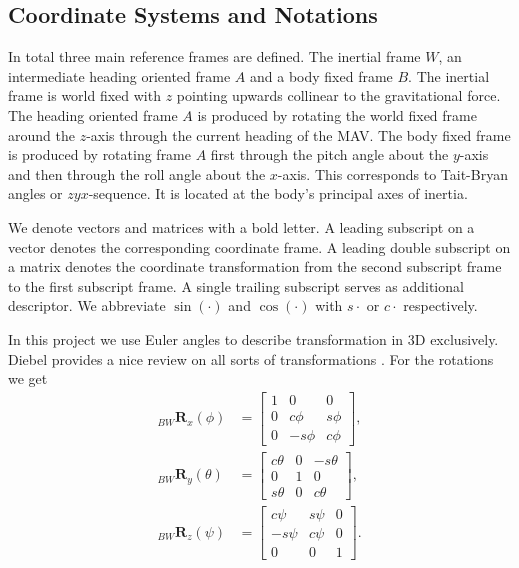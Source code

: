 \subsection{Coordinate Systems and Notations}
\label{sec:coordinates}
In total three main reference frames are defined. The inertial frame $W$, an intermediate heading oriented frame $A$ and a body fixed frame $B$. The inertial frame is world fixed with $z$ pointing upwards collinear to the gravitational force. The heading oriented frame $A$ is produced by rotating the world fixed frame around the $z$-axis through the current heading of the MAV. The body fixed frame is produced by rotating frame $A$ first through the pitch angle about the $y$-axis and then through the roll angle about the $x$-axis. This corresponds to Tait-Bryan angles or $zyx$-sequence. It is located at the body's principal axes of inertia.

We denote vectors and matrices with a bold letter. A leading subscript on a vector denotes the corresponding coordinate frame. A leading double subscript on a matrix denotes the coordinate transformation from the second subscript frame to the first subscript frame. A single trailing subscript serves as additional descriptor. We abbreviate $\sin(\cdot)$ and $\cos(\cdot)$ with $s \cdot$ or $c \cdot$ respectively.

In this project we use Euler angles to describe transformation in 3D exclusively. Diebel provides a nice review on all sorts of transformations \cite{Diebel2006}. For the rotations we get
\begin{align}
_{BW}\mathbf{R}_x (\phi)&=  \begin{bmatrix}
1 & 0 & 0 \\
0 & c\phi & s\phi \\
0 & -s\phi & c\phi
\end{bmatrix} ,\\
_{BW}\mathbf{R}_y (\theta)&=  \begin{bmatrix}
c\theta & 0 & -s\theta \\
0 & 1 & 0 \\
s\theta & 0 & c\theta
\end{bmatrix} ,\\
_{BW}\mathbf{R}_z (\psi)&=  \begin{bmatrix}
c\psi & s\psi & 0 \\
-s\psi & c\psi & 0 \\
0 & 0 &1
\end{bmatrix}.
\end{align}

